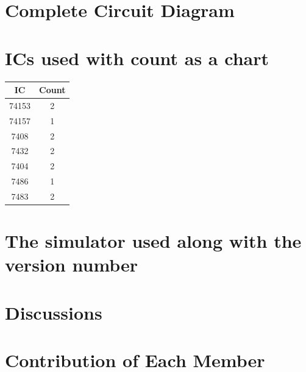 \documentclass[11pt]{article}
\begin{document}
\section{Complete Circuit Diagram}

\section{ICs used with count as a chart}
\begin{table}[ht]
    \centering
    \begin{tabular}{|c|c|}
        \hline
        IC & Count \\
        \hline
        74153 & 2 \\
        \hline
        74157 & 1 \\
        \hline
        7408 & 2 \\
        \hline
        7432 & 2 \\
        \hline
        7404 & 2 \\
        \hline
        7486 & 1 \\
        \hline
        7483 & 2 \\
        \hline
    \end{tabular}
\end{table}

\section{The simulator used along with the version number}

\section{Discussions}

\section{Contribution of Each Member}
\end{document}

